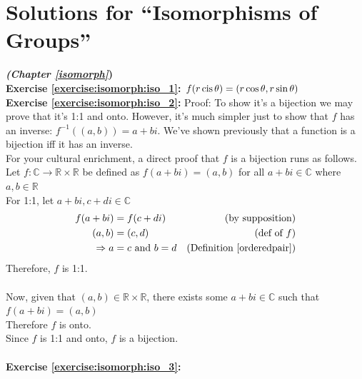 
\section{Solutions for ``Isomorphisms of Groups''}
\noindent\textbf{\textit{ (Chapter \ref{isomorph}})}\bigskip
\\
\textbf{Exercise \ref{exercise:isomorph:iso_1}:} 
$f(r \operatorname{cis} \theta) = (r\cos \theta, r \sin \theta )$
\\
\textbf{Exercise \ref{exercise:isomorph:iso_2}:}
Proof: To show it's a  bijection we may prove that it's 1:1 and onto.  However, it's much simpler just to show that 
$f$ has an inverse:  $f^{-1}( (a,b) ) = a + bi$.  We've shown previously that a function is a bijection iff it has an inverse.
\\
For your cultural enrichment, a direct proof that $f$ is a bijection runs as follows.
Let $f : {\mathbb C} \longrightarrow {\mathbb R} \times {\mathbb R}$ be defined as $f(a + bi) = (a,b)$ for all $a +  bi \in {\mathbb C}$ where $a, b \in {\mathbb R}$
\\
For 1:1, let $a + bi, c + di \in {\mathbb C}$
\begin{align*}
f(a + bi) &= f(c + di) &\text{(by supposition)}
\\
(a, b) &= (c, d) &\text{(def of\ } f)
\\
\implies a &= c \text{\ and\ } b = d &(\text{Definition~\ref{orderedpair}})
\end{align*}
Therefore, $f$ is 1:1.
\\
\\
Now, given that $(a, b) \in {\mathbb R} \times {\mathbb R}$, there exists some $a + bi \in {\mathbb C}$ such that $f(a + bi) = (a, b)$
\\
Therefore $f$ is onto.
\\
Since $f$ is 1:1 and onto, $f$ is a bijection.
\\\\

\noindent\textbf{Exercise \ref{exercise:isomorph:iso_3}:}
\\
\begin{figure}[H]
\end{figure}

